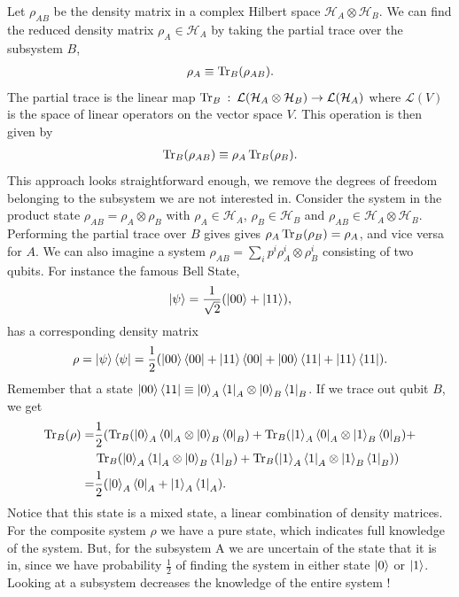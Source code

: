 \noindent Let $\rho_{AB}$ be the density matrix in a complex Hilbert space $\mathcal{H}_A\otimes\mathcal{H}_B$. We can find the reduced density matrix $\rho_A\in \mathcal{H}_A$  by taking the partial trace over the subsystem $B$,
\begin{align}
    \rho_A \equiv \Tr_B(\rho_{AB}).
\end{align}
The partial trace is the linear map $\Tr_B\: : \:\mathcal{L}(\mathcal{H}_A\otimes\mathcal{H}_B) \rightarrow \mathcal{L}(\mathcal{H}_A)$ where $\mathcal{L}(V)$ is the space of linear operators on the vector space $V$. This operation is then given by
\begin{align}
    \Tr_B(\rho_{AB}) \equiv \rho_A \Tr_B(\rho_B).
\end{align}
This approach looks straightforward enough, we remove the degrees of freedom belonging to the subsystem we are not interested in. Consider the system in the product state $\rho_{AB} = \rho_A \otimes \rho_B$ with $\rho_A\in \mathcal{H}_A$, $\rho_B\in \mathcal{H}_B$ and $\rho_{AB}\in \mathcal{H}_A\otimes\mathcal{H}_B$. Performing the partial trace over $B$ gives gives $\rho_A \Tr_B(\rho_B) = \rho_A$, and vice versa for $A$.\newline
We can also imagine a system $\rho_{AB} = \sum_i p^i \rho^i_A\otimes\rho^i_B$ consisting of two qubits. For instance the famous Bell State,
\begin{align}
    \ket{\psi} = \frac{1}{\sqrt{2}}(\ket{00}+\ket{11})
    \label{eq:bell_state},
\end{align}
has a corresponding density matrix
\begin{align}
    \rho = \ket{\psi}\bra{\psi} = \frac{1}{2}(\ket{00}\bra{00} + \ket{11}\bra{00} + \ket{00}\bra{11} + \ket{11}\bra{11}).
\end{align}
Remember that a state $\ket{00}\bra{11} \equiv \ket{0}_A\bra{1}_A \otimes \ket{0}_B\bra{1}_B$. If we trace out qubit $B$, we get 
\begin{align*}
    \Tr_B(\rho) = & \frac{1}{2}(\Tr_B(\ket{0}_A\bra{0}_A \otimes \ket{0}_B\bra{0}_B) + \Tr_B(\ket{1}_A\bra{0}_A \otimes \ket{1}_B\bra{0}_B) +\\
    & \Tr_B(\ket{0}_A\bra{1}_A \otimes \ket{0}_B\bra{1}_B) +\Tr_B( \ket{1}_A\bra{1}_A \otimes \ket{1}_B\bra{1}_B))\\
     = & \frac{1}{2}(\ket{0}_A\bra{0}_A + \ket{1}_A\bra{1}_A).
\end{align*}
Notice that this state is a mixed state, a linear combination of density matrices. For the composite system $\rho$ we have a pure state, which indicates full knowledge of the system. But, for the subsystem A we are uncertain of the state that it is in, since we have probability $\frac{1}{2}$ of finding the system in either state $\ket{0}$ or $\ket{1}$. Looking at a subsystem decreases the knowledge of the entire system \cite{Nielsen2011,Vershynina2013}!

